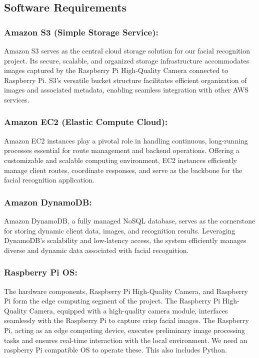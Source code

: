 \documentclass[11pt]{article}
\begin{document}
\subsection{Software Requirements}

\subsubsection{Amazon S3 (Simple Storage Service):}
Amazon S3 serves as the central cloud storage solution for our facial recognition project. Its secure, scalable, and organized storage infrastructure accommodates images captured by the Raspberry Pi High-Quality Camera connected to Raspberry Pi. S3's versatile bucket structure facilitates efficient organization of images and associated metadata, enabling seamless integration with other AWS services.

\subsubsection{Amazon EC2 (Elastic Compute Cloud):}
Amazon EC2 instances play a pivotal role in handling continuous, long-running processes essential for route management and backend operations. Offering a customizable and scalable computing environment, EC2 instances efficiently manage client routes, coordinate responses, and serve as the backbone for the facial recognition application.

\subsubsection{Amazon DynamoDB:}
Amazon DynamoDB, a fully managed NoSQL database, serves as the cornerstone for storing dynamic client data, images, and recognition results. Leveraging DynamoDB's scalability and low-latency access, the system efficiently manages diverse and dynamic data associated with facial recognition.

\subsubsection{Raspberry Pi OS:}
The hardware components, Raspberry Pi High-Quality Camera, and Raspberry Pi form the edge computing segment of the project. The Raspberry Pi High-Quality Camera, equipped with a high-quality camera module, interfaces seamlessly with the Raspberry Pi to capture crisp facial images. The Raspberry Pi, acting as an edge computing device, executes preliminary image processing tasks and ensures real-time interaction with the local environment. We need an raspberry Pi compatible OS to operate these. This also includes Python. 
\end{document}
